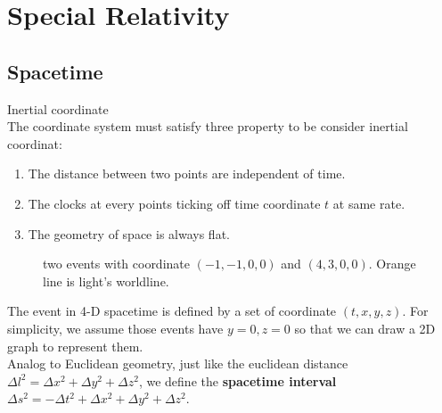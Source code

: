 \documentclass[12pt]{article}
\theoremstyle{mystyle}{\newtheorem{definition}{Definition}[section]}
\theoremstyle{mystyle}{\newtheorem{theorem}[definition]{Theorem}}
\theoremstyle{mystyle}{\newtheorem*{remark}{Remark}}
\theoremstyle{mystyle}{\newtheorem*{example}{Example}}
\theoremstyle{mystyle}{\newtheorem*{examples}{Examples}}
\theoremstyle{cstyle}{\newtheorem*{cthm}{}}
\begin{document}
\newpage
\appendix
{}

\section{Special Relativity}


\subsection{Spacetime}
\begin{definition}
  Inertial coordinate \\
  The coordinate system must satisfy three property to be consider inertial coordinat:
  \begin{enumerate}
    \item The distance between two points are independent of time.
    \item The clocks at every points ticking off time coordinate $t$ at same rate.
    \item The geometry of space is always flat.
  \end{enumerate}
\end{definition}

\begin{figure}[ht]
  \begin{center}
    \caption[]{two events with coordinate $(-1, -1, 0, 0)$ and $(4, 3, 0, 0)$. Orange line is light's worldline.}
  \end{center}
\end{figure}

The event in 4-D spacetime is defined by a set of coordinate \((t, x, y, z)\).
For simplicity, we assume those events have $y=0, z=0$ so that we can draw a 2D graph to represent them.\\
Analog to Euclidean geometry, just like the euclidean distance \(\Delta l^2 = \Delta x^2 + \Delta y^2 + \Delta z^2\), we define the
\textbf{spacetime interval} $\Delta s^2 = - \Delta t^2 + \Delta x^2 + \Delta y^2 + \Delta z^2$.
\end{document}
